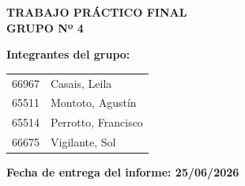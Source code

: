 \begin{center}
    
    {\large \textbf{TRABAJO PRÁCTICO FINAL}}\\[0.5cm]
    
    
    {\normalsize \textbf{GRUPO Nº 4}}\\[0.5cm]

\end{center}

\vspace{0.5cm}

\textbf{Integrantes del grupo:}

\vspace{0.3cm}

\begin{tabular}{p{5cm} p{8cm}}
66967 & Casais, Leila \\
65511 & Montoto, Agustín \\
65514 & Perrotto, Francisco \\
66675 & Vigilante, Sol \\
\end{tabular}

\vspace{0.8cm}

\textbf{Fecha de entrega del informe: 25/06/2026}

\vspace{1cm}

\newpage